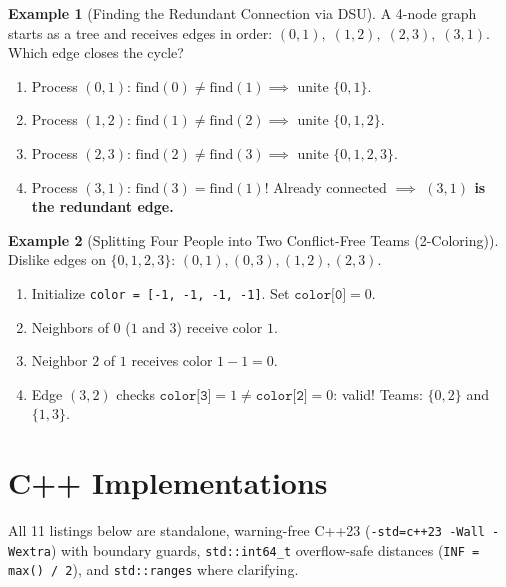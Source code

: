 \documentclass[11pt,a4paper]{article}
\theoremstyle{definition}
\newtheorem{example}{Example}[section]
\begin{document}
\vspace{-4pt}
\begin{example}[Finding the Redundant Connection via DSU]
A 4-node graph starts as a tree and receives edges in order: $(0,1),\; (1,2),\; (2,3),\; (3,1)$. Which edge closes the cycle?
\begin{enumerate}[itemsep=0.5pt, topsep=1pt, parsep=0pt]
    \item Process $(0,1)$: $\text{find}(0) \neq \text{find}(1) \implies$ unite $\{0, 1\}$.
    \item Process $(1,2)$: $\text{find}(1) \neq \text{find}(2) \implies$ unite $\{0, 1, 2\}$.
    \item Process $(2,3)$: $\text{find}(2) \neq \text{find}(3) \implies$ unite $\{0, 1, 2, 3\}$.
    \item Process $(3,1)$: $\text{find}(3) = \text{find}(1)$! Already connected $\implies$ \textbf{$(3, 1)$ is the redundant edge.}
\end{enumerate}
\end{example}

\vspace{-4pt}
\begin{example}[Splitting Four People into Two Conflict-Free Teams (2-Coloring)]
Dislike edges on $\{0, 1, 2, 3\}$: $(0,1), (0,3), (1,2), (2,3)$.
\begin{enumerate}[itemsep=0.5pt, topsep=1pt, parsep=0pt]
    \item Initialize \texttt{color = [-1, -1, -1, -1]}. Set $\texttt{color[0]} = 0$.
    \item Neighbors of $0$ ($1$ and $3$) receive color $1$.
    \item Neighbor $2$ of $1$ receives color $1 - 1 = 0$.
    \item Edge $(3, 2)$ checks $\texttt{color[3]} = 1 \neq \texttt{color[2]} = 0$: valid! Teams: $\{0, 2\}$ and $\{1, 3\}$.
\end{enumerate}
\end{example}

\section{C++ Implementations}

All 11 listings below are standalone, warning-free C++23 (\texttt{-std=c++23 -Wall -Wextra}) with boundary guards, \texttt{std::int64\_t} overflow-safe distances (\texttt{INF = max() / 2}), and \texttt{std::ranges} where clarifying.
\end{document}
